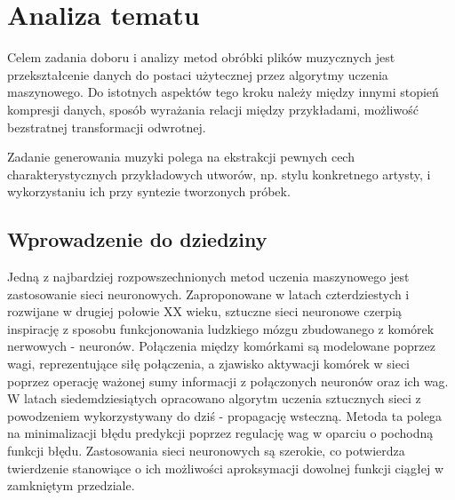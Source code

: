 \chapter{Analiza tematu}
{

  Celem zadania doboru i analizy metod obróbki plików muzycznych jest 
  przekształcenie danych do postaci użytecznej przez algorytmy uczenia maszynowego.
  Do istotnych aspektów tego kroku należy między innymi stopień kompresji danych,
  sposób wyrażania relacji między przykładami, możliwość bezstratnej transformacji odwrotnej. 

  Zadanie generowania muzyki polega na ekstrakcji pewnych cech charakterystycznych
  przykładowych utworów, np. stylu konkretnego artysty, 
  i wykorzystaniu ich przy syntezie tworzonych próbek. 

  \section{Wprowadzenie do dziedziny}
  {
    Jedną z najbardziej rozpowszechnionych metod uczenia maszynowego jest zastosowanie sieci neuronowych.
    Zaproponowane w latach czterdziestych i rozwijane w drugiej połowie XX wieku, sztuczne sieci neuronowe
    czerpią inspirację z sposobu funkcjonowania ludzkiego mózgu zbudowanego z komórek nerwowych - neuronów.
    Połączenia między komórkami są modelowane poprzez wagi, reprezentujące siłę połączenia, a zjawisko aktywacji
    komórek w sieci poprzez operację ważonej sumy informacji z połączonych neuronów oraz ich wag.
    W latach siedemdziesiątych opracowano algorytm uczenia sztucznych sieci z powodzeniem wykorzystywany
    do dziś - propagację wsteczną. Metoda ta polega na minimalizacji błędu predykcji poprzez regulację
    wag w oparciu o pochodną funkcji błędu.
    Zastosowania sieci neuronowych są szerokie, co potwierdza twierdzenie stanowiące 
    o ich możliwości aproksymacji dowolnej funkcji ciągłej w zamkniętym przedziale.

}}
